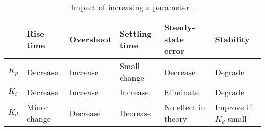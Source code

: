 \begin{table}[H]
\centering
\small
\begin{tabular}{|l|l|l|l|l|l|}
\hline
           & \textbf{Rise time}    & \textbf{Overshoot} & \textbf{Settling time} & \textbf{Steady-state error}  & \textbf{Stability}              \\ \hline
$K_p$      & Decrease     & Increase  & Small change  & Decrease            & Degrade                \\ \hline
$K_i$      & Decrease     & Increase  & Increase      & Eliminate           & Degrade                \\ \hline
$K_d$      & Minor change & Decrease  & Decrease      & No effect in theory & Improve if $K_d$ small \\ \hline
\end{tabular}
\caption{Impact of increasing a parameter \cite{PIDcontrolsystem}.}
\label{Manual-tuning}
\end{table}
\FloatBarrier